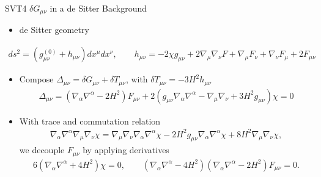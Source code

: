 \documentclass[8pt,aspectratio=1610]{beamer}
\begin{document}
\begin{frame}{SVT4 $\delta G_{\mu\nu}$ in a de Sitter Background}
	\begin{itemize}
		\item de Sitter geometry
	\end{itemize}
	\begin{eqnarray}
		ds^2 =(g_{\mu\nu}^{(0)} + h_{\mu\nu})dx^\mu dx^\nu,\qquad  h_{\mu\nu} = -2\chi g_{\mu\nu} + 2\nabla_\mu\nabla_\nu F + \nabla_\mu F_{\nu} + \nabla_\nu F_{\mu} + 2 F_{\mu\nu}
	\end{eqnarray}
	\begin{itemize}
		\item Compose $\Delta_{\mu\nu} = \delta G_{\mu\nu} + \delta T_{\mu\nu}$, with $\delta T_{\mu\nu} = -3 H^2 h_{\mu\nu}$
		\begin{eqnarray}
		\Delta_{\mu\nu}=(\nabla_{\alpha}\nabla^{\alpha}-2H^2)F_{\mu\nu}+2(g_{\mu\nu}\nabla_{\alpha}\nabla^{\alpha}-\nabla_{\mu}\nabla_{\nu}+3H^2g_{\mu\nu})\chi=0
		\end{eqnarray}
		\item With trace and commutation relation
		\begin{eqnarray}
		\nabla_{\alpha}\nabla^{\alpha}\nabla_{\mu}\nabla_{\nu}\chi=\nabla_{\mu}\nabla_{\nu}\nabla_{\alpha}\nabla^{\alpha}\chi
		-2H^2g_{\mu\nu}\nabla_{\alpha}\nabla^{\alpha}\chi
		+8H^2\nabla_{\mu}\nabla_{\nu}\chi,
		\end{eqnarray}
		we decouple $F_{\mu\nu}$ by applying derivatives
		\begin{eqnarray}
			6(\nabla_{\alpha}\nabla^{\alpha}+4H^2)\chi=0,\qquad 
			(\nabla_{\alpha}\nabla^{\alpha}-4H^2)(\nabla_{\alpha}\nabla^{\alpha}-2H^2)F_{\mu\nu}=0.
			\label{6.31a}
		\end{eqnarray}
	\end{itemize}
\end{frame}

\end{document}
